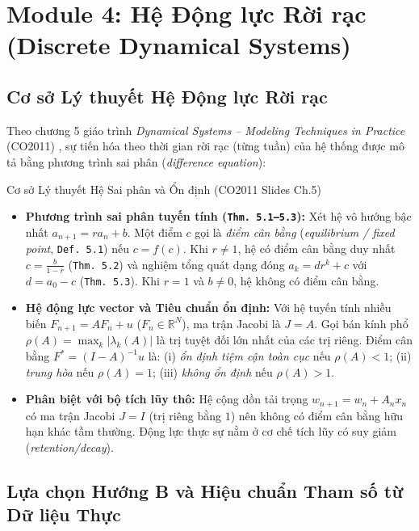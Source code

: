 \section{Module 4: Hệ Động lực Rời rạc (Discrete Dynamical Systems)}
\label{sec:m4}

\subsection{Cơ sở Lý thuyết Hệ Động lực Rời rạc}
Theo chương 5 giáo trình \textit{Dynamical Systems -- Modeling Techniques in Practice} (CO2011) \cite{slides_dynamics,giordano2013,elaydi2005}, sự tiến hóa theo thời gian rời rạc (từng tuần) của hệ thống được mô tả bằng phương trình sai phân (\textit{difference equation}):

\begin{theorybox}{Cơ sở Lý thuyết Hệ Sai phân và Ổn định (CO2011 Slides Ch.5)}
\begin{itemize}
    \item \textbf{Phương trình sai phân tuyến tính (\texttt{Thm. 5.1--5.3}):} Xét hệ vô hướng bậc nhất $a_{n+1} = r a_n + b$. Một điểm $c$ gọi là \textit{điểm cân bằng} (\textit{equilibrium / fixed point}, \texttt{Def. 5.1}) nếu $c = f(c)$. Khi $r \neq 1$, hệ có điểm cân bằng duy nhất $c = \frac{b}{1-r}$ (\texttt{Thm. 5.2}) và nghiệm tổng quát dạng đóng $a_k = d r^k + c$ với $d = a_0 - c$ (\texttt{Thm. 5.3}). Khi $r = 1$ và $b \neq 0$, hệ không có điểm cân bằng.
    \item \textbf{Hệ động lực vector và Tiêu chuẩn ổn định:} Với hệ tuyến tính nhiều biến $F_{n+1} = A F_n + u$ ($F_n \in \mathbb{R}^N$), ma trận Jacobi là $J = A$. Gọi bán kính phổ $\rho(A) = \max_k |\lambda_k(A)|$ là trị tuyệt đối lớn nhất của các trị riêng. Điểm cân bằng $F^* = (I - A)^{-1} u$ là: (i) \textit{ổn định tiệm cận toàn cục} nếu $\rho(A) < 1$; (ii) \textit{trung hòa} nếu $\rho(A) = 1$; (iii) \textit{không ổn định} nếu $\rho(A) > 1$.
    \item \textbf{Phân biệt với bộ tích lũy thô:} Hệ cộng dồn tải trọng $w_{n+1} = w_n + A_n x_n$ có ma trận Jacobi $J = I$ (trị riêng bằng $1$) nên không có điểm cân bằng hữu hạn khác tầm thường. Động lực thực sự nằm ở cơ chế tích lũy có suy giảm (\textit{retention/decay}).
\end{itemize}
\end{theorybox}

\subsection{Lựa chọn Hướng B và Hiệu chuẩn Tham số từ Dữ liệu Thực}
\label{sec:m4_calib}


